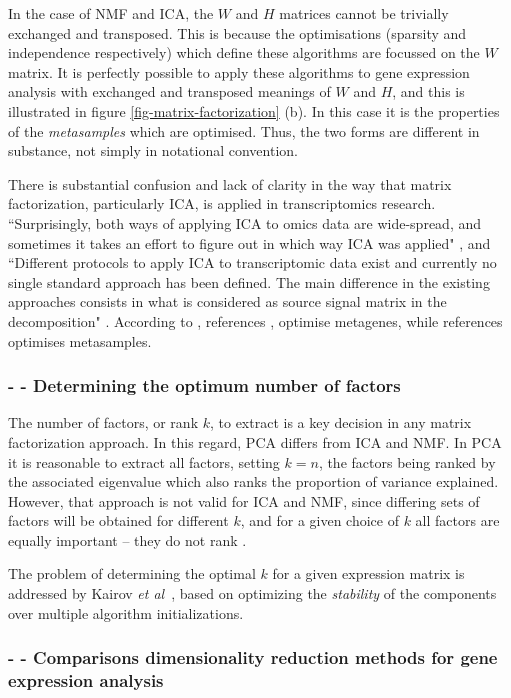 \documentclass[tikz, 11pt,a4paper,oneside,fleqn, draft]{article}
\newcommand{\etal}{{\em et al\/}}
\begin{document}
In the case of NMF and ICA, the $W$ and $H$ matrices cannot be trivially exchanged and transposed.  This is because the optimisations (sparsity and independence respectively) which define these algorithms are focussed on the $W$ matrix.  It is perfectly possible to apply these algorithms to gene expression analysis with exchanged and transposed meanings of $W$ and $H$, and this is illustrated in figure \ref{fig-matrix-factorization} (b).  In this case it is the properties of the \emph{metasamples} which are optimised.  Thus, the two forms are different in substance, not simply in notational convention.

There is substantial confusion and lack of clarity in the way that matrix factorization, particularly ICA, is applied in transcriptomics research.  
``Surprisingly, both ways of applying ICA to omics data are wide-spread, and sometimes it takes an effort to figure out in which way ICA was applied" \cite{Sompairac2019}, and ``Different protocols to apply ICA to transcriptomic data exist and currently no single standard approach has been defined. The main difference in the existing approaches consists in what is considered as source signal matrix in the decomposition" \cite{Cantini2019}.  
According to \cite{Cantini2019}, references \cite{Au-Yeung2014,Kairov2017,Kong2008,Lee2003},  optimise metagenes, while references \cite{Meng2016,Barillot2013} optimises metasamples.


\subsubsection{- - Determining the optimum number of factors}

The number of factors, or rank $k$, to extract is a key decision in any matrix factorization approach.  In this regard, PCA differs from ICA and NMF.  In PCA it is reasonable to extract all factors, setting $k=n$, the factors being ranked by the associated eigenvalue which also ranks the proportion of variance explained.   However, that approach is not valid for ICA and NMF, since differing sets of factors will be obtained for different $k$, and for a given choice of $k$ all factors are equally important -- they do not rank \cite{Stein-OBrien2018}.

The problem of determining the optimal $k$ for a given expression matrix is addressed  by Kairov \etal\ \cite{Kairov2017}, based on optimizing the \emph{stability} of the components over multiple algorithm initializations.

\subsubsection{- - Comparisons dimensionality reduction methods for gene expression analysis}
\label{sec-comparative-dimensionality-studies}
\end{document}
